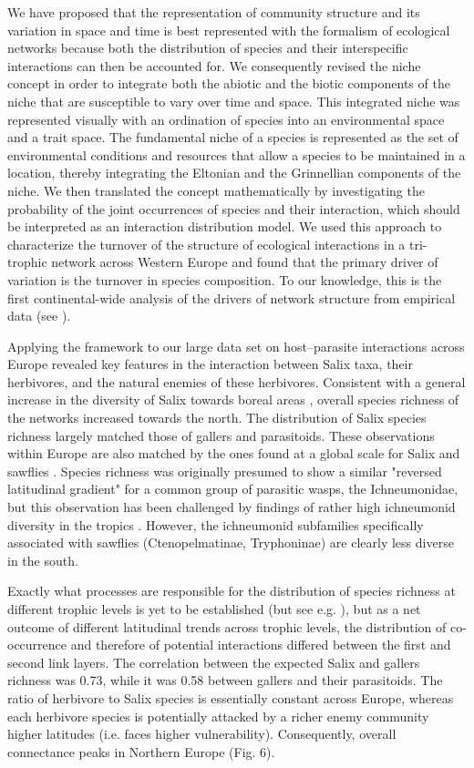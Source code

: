 \documentclass[12pt]{article}
\begin{document}
We have proposed that the representation of community structure and its variation
in space and time is best represented with the formalism of ecological
networks because both the distribution of species and their interspecific
interactions can then be accounted for. We consequently revised the niche concept in
order to integrate both the abiotic and the biotic components of the niche
that are susceptible to vary over time and space. This integrated niche was
represented visually with an ordination of species into an environmental space
and a trait space. The fundamental niche of a species is represented as the
set of environmental conditions and resources that allow a species to be
maintained in a location, thereby integrating the Eltonian and the Grinnellian
components of the niche. We then translated the concept mathematically by
investigating the probability of the joint occurrences of species and 
their interaction, which should be interpreted as an interaction distribution
model. We used this approach to characterize the turnover of the structure of
ecological interactions in a tri-trophic network across Western Europe and
found that the primary driver of variation is the turnover in species
composition. To our knowledge, this is the first continental-wide analysis of
the drivers of network structure from empirical data (see \citealt{Albouy2014,
Poisot2016}).

Applying the framework to our large data set on host–parasite interactions
across Europe revealed key features in the interaction between Salix taxa, their
herbivores, and the natural enemies of these herbivores. Consistent with a
general increase in the diversity of Salix towards boreal areas
\citep{Cronk2015}, overall species richness of the networks increased towards
the north. The distribution of Salix species richness largely matched those of
gallers and parasitoids. These observations within Europe are
also matched by the ones found at a global scale for Salix \citep{Argus1997,
Cronk2015, Wu2015} and sawflies \citep{Kouki1994, Kouki1999}. Species richness
was originally presumed to show a similar "reversed latitudinal gradient" for
a common group of parasitic wasps, the Ichneumonidae, but this observation
has been challenged by findings of rather high ichneumonid diversity in the
tropics \citep{Veijalainen2013}. However, the ichneumonid subfamilies
specifically associated with sawflies (Ctenopelmatinae, Tryphoninae) are
clearly less diverse in the south.

Exactly what processes are responsible for the distribution of species
richness at different trophic levels is yet to be established (but see e.g.
\citealt{Roininen2005, Nyman2010, Leppanen2014}), but as a net
outcome of different latitudinal trends across trophic levels, the
distribution of co-occurrence and therefore of potential interactions differed
between the first and second link layers. The correlation between the expected
Salix and gallers richness was 0.73, while it was 0.58 between gallers and
their parasitoids. The ratio of herbivore to Salix species is essentially constant
across Europe, whereas each herbivore species is potentially attacked by a
richer enemy community higher latitudes (i.e. faces higher vulnerability).
Consequently, overall connectance peaks in Northern Europe (Fig. 6).
\end{document}
